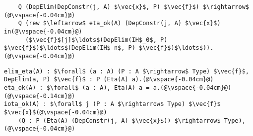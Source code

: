 \begin{figure*}
\begin{minipage}{0.56\textwidth}
\begin{lstlisting}
    Q (DepElim(DepConstr(j, A) $\vec{x}$, P) $\vec{f}$) $\rightarrow$ (@\vspace{-0.04cm}@)
    Q (rew $\leftarrow$ eta_ok(A) (DepConstr(j, A) $\vec{x}$) in(@\vspace{-0.04cm}@)
      ($\vec{f}$[j]$\ldots$(DepElim(IH$_0$, P) $\vec{f}$)$\ldots$(DepElim(IH$_n$, P) $\vec{f}$)$\ldots$)).(@\vspace{-0.04cm}@)
\end{lstlisting}
\end{minipage}
\iffalse
\begin{minipage}{0.44\textwidth}
\end{minipage}
\hfill
\begin{minipage}{0.55\textwidth}
\begin{lstlisting}
elim_eta(A) : $\forall$ (a : A) (P : A $\rightarrow$ Type) $\vec{f}$, DepElim(a, P) $\vec{f}$ : P (Eta(A) a).(@\vspace{-0.04cm}@)
eta_ok(A) : $\forall$ (a : A), Eta(A) a = a.(@\vspace{-0.04cm}@)
(@\vspace{-0.14cm}@)
iota_ok(A) : $\forall$ j (P : A $\rightarrow$ Type) $\vec{f}$ $\vec{x}$(@\vspace{-0.04cm}@)
    (Q : P (Eta(A) (DepConstr(j, A) $\vec{x}$)) $\rightarrow$ Type),(@\vspace{-0.04cm}@)

\end{lstlisting}
\end{minipage}
\end{figure*}

